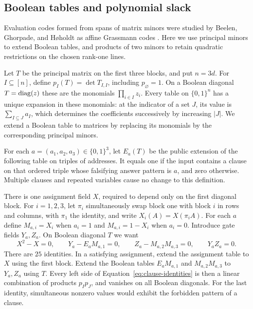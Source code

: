 \subsection{Boolean tables and polynomial slack}

Evaluation codes formed from spans of matrix minors were studied by
Beelen, Ghorpade, and H\o holdt as affine Grassmann codes
\cite{BeelenGhorpadeHoholdt2010}. Here we use principal minors to extend
Boolean tables, and products of two minors to retain quadratic restrictions
on the chosen rank-one lines.

Let $T$ be the principal matrix on the first three blocks, and put
$n=3d$. For $I\subseteq[n]$, define
$p_I(T)=\det T_{I,I}$, including $p_\varnothing=1$.
On a Boolean diagonal $T=\operatorname{diag}(z)$ these are the monomials
$\prod_{i\in I}z_i$. Every table on $\{0,1\}^n$ has a unique expansion
in these monomials: at the indicator of a set $J$, its value is
$\sum_{I\subseteq J}a_I$, which determines the coefficients successively
by increasing $|J|$. We extend a Boolean table to matrices by replacing
its monomials by the corresponding principal minors.

For each $a=(a_1,a_2,a_3)\in\{0,1\}^3$, let $E_a(T)$ be the public
extension of the following table on triples of addresses. It equals
one if the input contains a clause on that ordered triple whose
falsifying answer pattern is $a$, and zero otherwise. Multiple clauses
and repeated variables cause no change to this definition.

There is one assignment field $X$, required to depend only on the first
diagonal block. For $i=1,2,3$, let $\pi_i$ simultaneously swap block
one with block $i$ in rows and columns, with $\pi_1$ the identity, and
write $X_i(A)=X(\pi_i A)$. For each $a$ define
$M_{a,i}=X_i$ when $a_i=1$ and $M_{a,i}=1-X_i$ when $a_i=0$.
Introduce gate fields $Y_a,Z_a$. On Boolean diagonal $T$ we want
\begin{equation}\label{eq:clause-identities}
 X^2-X=0,\qquad
 Y_a-E_aM_{a,1}=0,\qquad
 Z_a-M_{a,2}M_{a,3}=0,\qquad Y_aZ_a=0.
\end{equation}
There are $25$ identities. In a satisfying assignment, extend the
assignment table to $X$ using the first block. Extend the Boolean
tables $E_aM_{a,1}$ and $M_{a,2}M_{a,3}$ to $Y_a,Z_a$ using $T$.
Every left side of Equation~\ref{eq:clause-identities} is then a linear
combination of products $p_Ip_J$, and vanishes on all Boolean diagonals.
For the last identity, simultaneous nonzero values would exhibit the
forbidden pattern of a clause.

